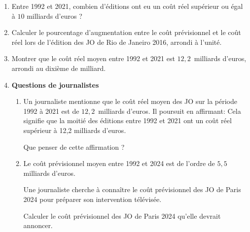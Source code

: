 \documentclass[exercice,a4]{thedocument}%
\begin{document}
\medskip

\begin{enumerate}
\item Entre 1992 et 2021, combien d'éditions ont eu un coût réel supérieur ou égal à $10$ milliards d'euros ?
\item Calculer le pourcentage d'augmentation entre le coût prévisionnel et le coût réel lors de l'édition des JO de Rio de Janeiro 2016, arrondi à l'unité.
\item Montrer que le coût réel moyen entre 1992 et 2021 est $12,2$~milliards d'euros, arrondi au dixième de milliard.
\item \textbf{Questions de journalistes}
	\begin{enumerate}
		\item Un journaliste mentionne que le coût réel moyen des JO sur la période 1992 à 2021 est de $12,2$~milliards d'euros. Il poursuit en affirmant: \og Cela signifie que la moitié des éditions entre 1992 et 2021 ont un coût réel supérieur à 12,2 milliards d'euros. \fg
		
Que penser de cette affirmation ?
		\item Le coût prévisionnel moyen entre 1992 et 2024 est de l'ordre de $5,5$ milliards d'euros.
		
Une journaliste cherche à connaître le coût prévisionnel des JO de Paris 2024 pour préparer son intervention télévisée.
		
Calculer le coût prévisionnel des JO de Paris 2024 qu'elle devrait annoncer.
	\end{enumerate}
\end{enumerate}

\bigskip
\showthesource
\end{document}
